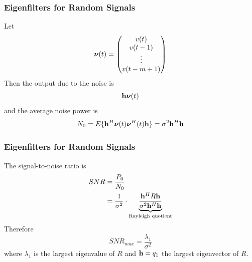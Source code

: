 \documentclass{beamer}
\begin{document}
\begin{frame}\frametitle{Eigenfilters for Random Signals}
	Let 
	\[ 
		\boldsymbol{\nu}(t) 
			= \begin{pmatrix}
	    		v(t)\\
	    		v(t-1)\\
	    		\vdots
	    		\\
	    		v(t-m+1)
	  		  \end{pmatrix}
	\]
	Then the output due to the noise is
	\[ 
		\mathbf{h}\boldsymbol{\nu}(t) 
	\]
	and the average noise power is
	\[ 
		N_0 = E\{\mathbf{h}^H\boldsymbol{\nu}(t)\boldsymbol{\nu}^H(t)\mathbf{h}\} 
		    = \sigma^2\mathbf{h}^H\mathbf{h} 
	\]
\end{frame}

\begin{frame}\frametitle{Eigenfilters for Random Signals}
	The signal-to-noise ratio is
	\begin{align*}
		SNR &= \frac{P_0}{N_0} \\
		    &= \frac{1}{\sigma^2} \cdot
		    	\underbrace{
		    		\frac{\mathbf{h}^HR\mathbf{h}}{\sigma^2\mathbf{h}^H\mathbf{h}}
		    	}_{\text{Rayleigh quotient}} 
	\end{align*}
	Therefore
	\[ 
		SNR_{max} = \frac{\lambda_1}{\sigma^2} 
	\]
	where $\lambda_1$ is the largest eigenvalue of $R$ and $\mathbf{h} = q_1$ the largest eigenvector of $R$.
\end{frame}
\end{document}
